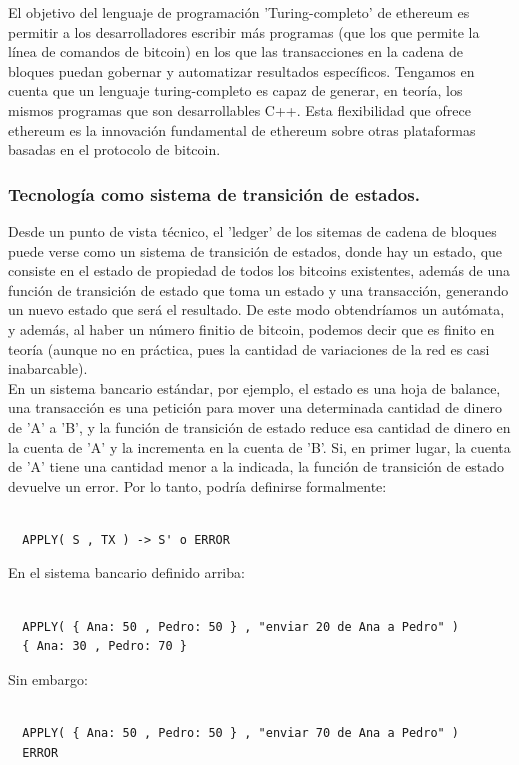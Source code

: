 \documentclass[11pt,a4paper]{article}
\begin{document}
El objetivo del lenguaje de programación 'Turing-completo' de ethereum es permitir a los
desarrolladores escribir más programas (que los que permite la línea de comandos de bitcoin) en los que las transacciones en la cadena de bloques puedan gobernar y automatizar resultados específicos. Tengamos en cuenta que un lenguaje turing-completo es capaz de generar, en teoría, los mismos programas que son desarrollables C++. Esta flexibilidad que ofrece ethereum es la innovación fundamental de ethereum sobre otras plataformas basadas en el protocolo de bitcoin.\\

\subsubsection{Tecnología como sistema de transición de estados.}

Desde un punto de vista técnico, el 'ledger' de los sitemas de cadena de bloques puede verse como un sistema de transición de estados, donde hay un estado, que consiste en el estado de propiedad de todos los bitcoins existentes, además de una función de transición de estado que toma un estado y una transacción, generando un nuevo estado que será el resultado. De este modo obtendríamos un autómata, y además, al haber un número finitio de bitcoin, podemos decir que es finito en teoría (aunque no en práctica, pues la cantidad de variaciones de la red es casi inabarcable).\\

En un sistema bancario estándar, por ejemplo, el estado es una hoja de balance, una transacción es una petición para mover una determinada cantidad de dinero de 'A' a 'B', y la función de transición de estado reduce esa cantidad de dinero en la cuenta de 'A' y la incrementa en la cuenta de 'B'. Si, en primer lugar, la cuenta de 'A' tiene una cantidad menor a la indicada, la función de transición de estado devuelve un error. Por lo tanto, podría definirse formalmente:
\begin{lstlisting}

  APPLY( S , TX ) -> S' o ERROR

\end{lstlisting}


En el sistema bancario definido arriba:
\begin{lstlisting}

  APPLY( { Ana: 50 , Pedro: 50 } , "enviar 20 de Ana a Pedro" ) 
  { Ana: 30 , Pedro: 70 }

\end{lstlisting}
Sin embargo:
\begin{lstlisting}

  APPLY( { Ana: 50 , Pedro: 50 } , "enviar 70 de Ana a Pedro" ) 
  ERROR

\end{lstlisting}
\end{document}
